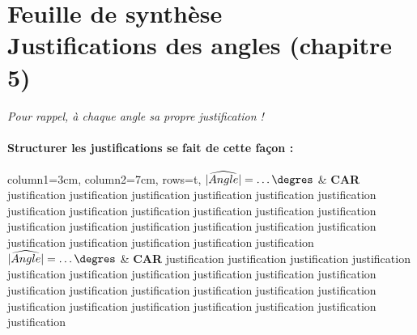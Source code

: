 \documentclass[paper=a4, twoside, fontsize=12pt, parskip=half-, numbers=enddot, open=right]{scrbook}
\begin{document}
\chapter*{Feuille de synthèse \\ Justifications des angles (chapitre 5)}

\begin{center}
   \emph{Pour rappel, à chaque angle sa propre justification ! } 
\end{center}


\subsubsection{Structurer les justifications se fait de cette façon : 
}

\begin{center}
    \begin{tblr}{
            column{1}={3cm},
            column{2}={7cm},
            rows={t},
        }
        $|\widehat{Angle}|= \dots \degres$ & \textbf{CAR} justification justification justification justification justification justification justification justification justification justification justification justification justification justification justification justification justification justification justification justification justification justification justification  \\
        $|\widehat{Angle}|= \dots \degres$ & \textbf{CAR}  justification justification justification justification justification justification justification justification justification justification justification justification justification justification justification justification justification justification justification justification justification justification justification
    \end{tblr}
\end{center}
\end{document}
